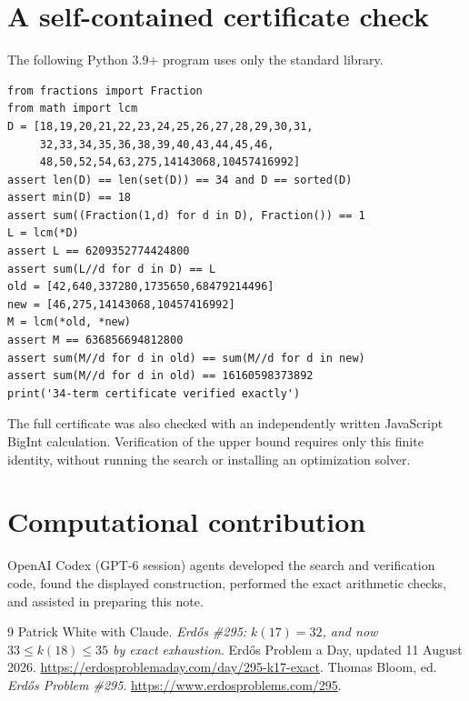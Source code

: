 \documentclass[11pt]{article}
\begin{document}
\section{A self-contained certificate check}
The following Python 3.9+ program uses only the standard library.
\begin{verbatim}
from fractions import Fraction
from math import lcm
D = [18,19,20,21,22,23,24,25,26,27,28,29,30,31,
     32,33,34,35,36,38,39,40,43,44,45,46,
     48,50,52,54,63,275,14143068,10457416992]
assert len(D) == len(set(D)) == 34 and D == sorted(D)
assert min(D) == 18
assert sum((Fraction(1,d) for d in D), Fraction()) == 1
L = lcm(*D)
assert L == 6209352774424800
assert sum(L//d for d in D) == L
old = [42,640,337280,1735650,68479214496]
new = [46,275,14143068,10457416992]
M = lcm(*old, *new)
assert M == 636856694812800
assert sum(M//d for d in old) == sum(M//d for d in new)
assert sum(M//d for d in old) == 16160598373892
print('34-term certificate verified exactly')
\end{verbatim}
The full certificate was also checked with an independently written
JavaScript BigInt calculation. Verification of the upper bound requires
only this finite identity, without running the search or installing an
optimization solver.

\section*{Computational contribution}
OpenAI Codex (GPT-6 session) agents developed the search and verification
code, found the displayed construction, performed the exact arithmetic
checks, and assisted in preparing this note.

\begin{thebibliography}{9}
Patrick White with Claude.
\emph{Erd\H{o}s \#295: $k(17)=32$, and now $33\le k(18)\le35$
by exact exhaustion}. Erd\H{o}s Problem a Day, updated 11 August 2026.
\url{https://erdosproblemaday.com/day/295-k17-exact}.
Thomas Bloom, ed. \emph{Erd\H{o}s Problem \#295}.
\url{https://www.erdosproblems.com/295}.
\end{thebibliography}
\end{document}
